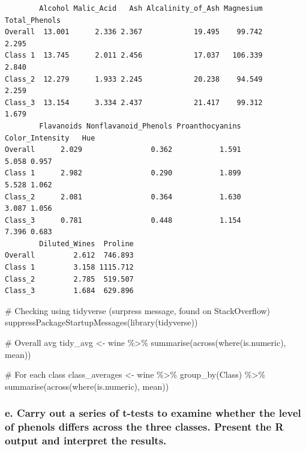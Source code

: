 \documentclass[
  letterpaper,
  DIV=11,
  numbers=noendperiod]{scrartcl}
\newenvironment{Shaded}{\begin{snugshade}}{\end{snugshade}}
\newcommand{\CommentTok}[1]{\textcolor[rgb]{0.37,0.37,0.37}{#1}}
\newcommand{\FunctionTok}[1]{\textcolor[rgb]{0.28,0.35,0.67}{#1}}
\newcommand{\NormalTok}[1]{\textcolor[rgb]{0.00,0.23,0.31}{#1}}
\newcommand{\OtherTok}[1]{\textcolor[rgb]{0.00,0.23,0.31}{#1}}
\newcommand{\SpecialCharTok}[1]{\textcolor[rgb]{0.37,0.37,0.37}{#1}}
\begin{document}
\begin{verbatim}
        Alcohol Malic_Acid   Ash Alcalinity_of_Ash Magnesium Total_Phenols
Overall  13.001      2.336 2.367            19.495    99.742         2.295
Class 1  13.745      2.011 2.456            17.037   106.339         2.840
Class_2  12.279      1.933 2.245            20.238    94.549         2.259
Class_3  13.154      3.334 2.437            21.417    99.312         1.679
        Flavanoids Nonflavanoid_Phenols Proanthocyanins Color_Intensity   Hue
Overall      2.029                0.362           1.591           5.058 0.957
Class 1      2.982                0.290           1.899           5.528 1.062
Class_2      2.081                0.364           1.630           3.087 1.056
Class_3      0.781                0.448           1.154           7.396 0.683
        Diluted_Wines  Proline
Overall         2.612  746.893
Class 1         3.158 1115.712
Class_2         2.785  519.507
Class_3         1.684  629.896
\end{verbatim}

\begin{Shaded}
\begin{Highlighting}[]
\CommentTok{\# Checking using tidyverse (surpress message, found on StackOverflow)}
\FunctionTok{suppressPackageStartupMessages}\NormalTok{(}\FunctionTok{library}\NormalTok{(tidyverse))}

\CommentTok{\# Overall avg}
\NormalTok{tidy\_avg }\OtherTok{\textless{}{-}}\NormalTok{ wine }\SpecialCharTok{\%\textgreater{}\%}
  \FunctionTok{summarise}\NormalTok{(}\FunctionTok{across}\NormalTok{(}\FunctionTok{where}\NormalTok{(is.numeric), mean))}

\CommentTok{\# For each class}
\NormalTok{class\_averages }\OtherTok{\textless{}{-}}\NormalTok{ wine }\SpecialCharTok{\%\textgreater{}\%}
  \FunctionTok{group\_by}\NormalTok{(Class) }\SpecialCharTok{\%\textgreater{}\%}
  \FunctionTok{summarise}\NormalTok{(}\FunctionTok{across}\NormalTok{(}\FunctionTok{where}\NormalTok{(is.numeric), mean))}
\end{Highlighting}
\end{Shaded}

\subsubsection{e. Carry out a series of t-tests to examine whether the
level of phenols differs across the three classes. Present the R output
and interpret the
results.}\label{e.-carry-out-a-series-of-t-tests-to-examine-whether-the-level-of-phenols-differs-across-the-three-classes.-present-the-r-output-and-interpret-the-results.}
\end{document}
